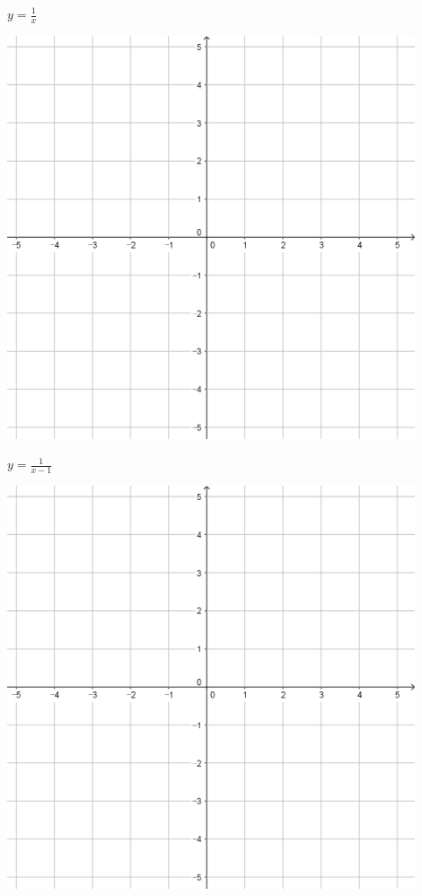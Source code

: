 \documentclass{oblivoir}
\begin{document}
\clearpage
\begin{minipage}{0.45\textwidth}\centering
\(y=\frac1x\)
\par\bigskip\includegraphics[width=0.9\textwidth]{55}
\end{minipage}
\begin{minipage}{0.45\textwidth}\centering
\(y=\frac1{x-1}\)
\par\bigskip\includegraphics[width=0.9\textwidth]{55}
\end{minipage}\bigskip\bigskip\par
\end{document}
